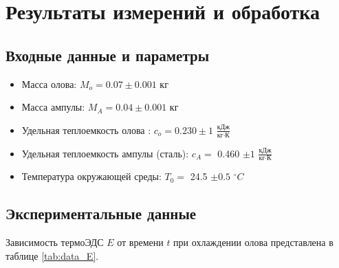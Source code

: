 \documentclass[a4paper]{article}
\begin{document}
\section{\textbf{Результаты измерений и обработка}}

\subsection{Входные данные и параметры}

\begin{itemize}
    \item Масса олова: $M_o = 0.07 \pm 0.001$ кг
    \item Масса ампулы: $M_A = 0.04 \pm 0.001$ кг
    \item Удельная теплоемкость олова : $c_o = 0.230 \pm 1$  $\frac{\text{кДж}}{\text{кг}\cdot\text{К}}$ 
    \item Удельная теплоемкость ампулы (сталь): $c_A = $ 0.460 $\pm 1$ $\frac{\text{кДж}}{\text{кг}\cdot\text{К}}$
    \item Температура окружающей среды: $T_0 = $ 24.5 $\pm 0.5$ $^{\circ}C$
\end{itemize}

\subsection{Экспериментальные данные}

Зависимость термоЭДС $E$ от времени $t$ при охлаждении олова представлена в таблице \ref{tab:data_E}.
\end{document}
